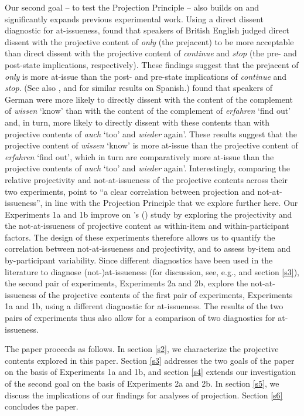 \documentclass[11pt,fleqn]{article}
\newcommand{\6}{\mbox{$[\hspace*{-.6mm}[$}}
\newcommand{\9}{\mbox{$]\hspace*{-.6mm}]$}}
\newcommand{\citetpos}[1]{\citeauthor{#1}'s (\citeyear{#1})}
\begin{document}
Our second goal -- to test the Projection Principle -- also builds on and significantly expands previous experimental work. 
 Using a direct dissent diagnostic for at-issueness, \citet{amaral-etal11} found that speakers of British English judged direct dissent with the projective content of {\em only} (the prejacent) to be more acceptable than direct dissent with the projective content of {\em continue} and {\em stop} (the pre- and post-state implications, respectively). These findings suggest that the prejacent of {\em only} is more at-issue than the post- and pre-state implications of {\em continue} and {\em stop}. (See also \citealt{cummins-etal2012}, and \citealt{amaral-cummins2015} for similar results on Spanish.) \citet{xue-onea11} found that speakers of German were more likely to directly dissent with the content of the complement of {\em wissen} `know' than with the content of the complement of {\em erfahren} `find out' and, in turn, more likely to directly dissent with these contents than with projective contents of {\em auch} `too' and {\em wieder} again'. These results suggest that the projective content of {\em wissen} `know' is more at-issue than the projective content of {\em erfahren} `find out', which in turn are comparatively more at-issue than the projective contents of {\em auch} `too' and {\em wieder} again'. Interestingly, comparing the relative projectivity and not-at-issueness 
of the projective contents across their two experiments, \citet[180]{xue-onea11} point to ``a clear correlation between projection and not-at-issueness'', in line with the Projection Principle that we explore further here. Our Experiments 1a and 1b improve on \citetpos{xue-onea11} study by exploring the projectivity and the not-at-issueness of projective content as within-item and within-participant factors. The design of these experiments therefore allows us to quantify the correlation between not-at-issueness and projectivity, and to assess by-item and by-participant variability. Since different diagnostics have been used in the literature to diagnose (not-)at-issueness (for discussion, see, e.g., \citealt{tonhauser-sula6} and section \ref{s3}), the second pair of experiments, Experiments 2a and 2b, explore the not-at-issueness of the projective contents of the first pair of experiments, Experiments 1a and 1b, using a different diagnostic for at-issueness. The results of the two pairs of experiments thus also allow for a comparison of two diagnostics for at-issueness.

The paper proceeds as follows. In section \ref{s2}, we characterize the projective contents explored in this paper. Section \ref{s3} addresses the two goals of the paper on the basis of Experiments 1a and 1b, and section \ref{s4} extends our investigation of the second goal on the basis of Experiments 2a and 2b. In section \ref{s5}, we discuss the implications of our findings for analyses of projection. Section \ref{s6} concludes the paper.
\end{document}
